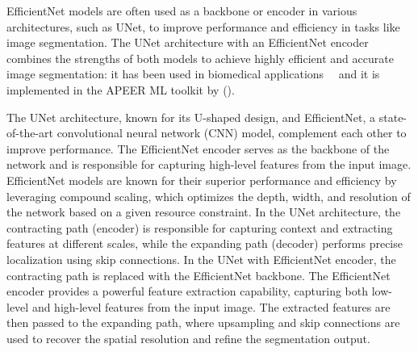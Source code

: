 \documentclass[runningheads]{llncs}
\begin{document}

EfficientNet models are often used as a backbone or encoder in various architectures, such as UNet, to improve performance and efficiency in tasks like image segmentation. The UNet architecture with an EfficientNet encoder combines the strengths of both models to achieve highly efficient and accurate image segmentation: it has been used in biomedical applications~\cite{le2022cell}~\cite{liu_automatic_2022} and it is implemented in the  APEER ML toolkit by {}(\cite{Zeiss23}).

The UNet architecture, known for its U-shaped design, and EfficientNet, a state-of-the-art convolutional neural network (CNN) model, complement each other to improve performance. The EfficientNet encoder serves as the backbone of the network and is responsible for capturing high-level features from the input image. EfficientNet models are known for their superior performance and efficiency by leveraging compound scaling, which optimizes the depth, width, and resolution of the network based on a given resource constraint. In the UNet architecture, the contracting path (encoder) is responsible for capturing context and extracting features at different scales, while the expanding path (decoder) performs precise localization using skip connections. In the UNet with EfficientNet encoder, the contracting path is replaced with the EfficientNet backbone. The EfficientNet encoder provides a powerful feature extraction capability, capturing both low-level and high-level features from the input image. The extracted features are then passed to the expanding path, where upsampling and skip connections are used to recover the spatial resolution and refine the segmentation output.

%
\end{document}
